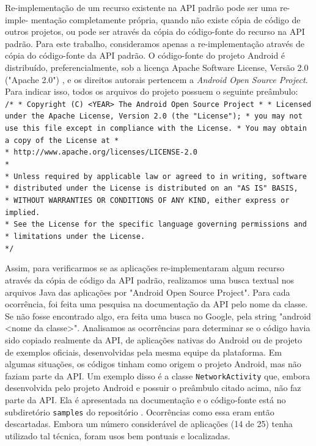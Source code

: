 Re-implementação de um recurso existente na API padrão pode ser uma re-imple- mentação
completamente própria, quando não existe cópia de código de outros projetos, ou pode
ser através da cópia do código-fonte do recurso na API padrão. Para este trabalho,
consideramos apenas a re-implementação através de cópia do código-fonte da API padrão.
O código-fonte do projeto Android é distribuído, preferencialmente, sob a licença Apache 
Software License, Versão 2.0 ("Apache 2.0") \cite{License}, e os direitos autorais
pertencem a \textit{Android Open Source Project}. Para indicar isso, todos os arquivos
do projeto possuem o seguinte preâmbulo:
\texttt{
\newline
/* \newline
 * Copyright (C) <YEAR> The Android Open Source Project \newline
 * \newline
 * Licensed under the Apache License, Version 2.0 (the "License"); \newline
 * you may not use this file except in compliance with the License. \newline
 * You may obtain a copy of the License at \newline
 * \\
 *      http://www.apache.org/licenses/LICENSE-2.0 \\
 * \\
 * Unless required by applicable law or agreed to in writing, software \\
 * distributed under the License is distributed on an "AS IS" BASIS, \\
 * WITHOUT WARRANTIES OR CONDITIONS OF ANY KIND, either express or implied. \\
 * See the License for the specific language governing permissions and \\
 * limitations under the License. \\
 */
} 

Assim, para verificarmos se as aplicações re-implementaram algum recurso através
da cópia de código da API padrão, realizamos uma busca textual nos arquivos Java
das aplicações por "Android Open Source Project". Para cada ocorrência, foi feita
uma pesquisa na documentação da API pelo nome da classe. Se não fosse encontrado
algo, era feita uma busca no Google, pela string "android <nome da classe>".
Analisamos as ocorrências  para determinar se o código havia sido copiado realmente
da API, de aplicações nativas do Android ou de projeto de exemplos oficiais,
desenvolvidas pela mesma equipe da plataforma. Em algumas situações, os códigos
tinham como origem o projeto Android, mas não faziam parte da API. Um exemplo disso
é a classe \texttt{NetworkActivity} que, embora desenvolvida pelo projeto Android e
possuir o preâmbulo citado acima, não faz parte da API. Ela é apresentada na
documentação \cite{NetworkUsage} e o código-fonte está no subdiretório \texttt{samples}
do repositório \cite{NetworkActivity}. Ocorrências como essa eram então descartadas.
Embora um número considerável de aplicações (14 de 25) tenha utilizado tal técnica,
foram usos bem pontuais e localizadas.


